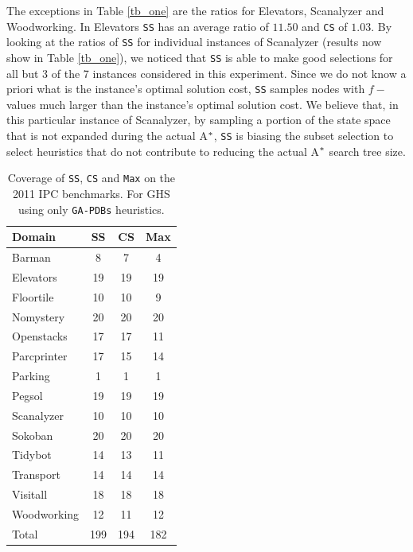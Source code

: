 The exceptions in Table \ref{tb_one} are the ratios for Elevators, Scanalyzer and Woodworking. In Elevators \texttt{SS} has an average ratio of $11.50$ and \texttt{CS} of $1.03$. By looking at the ratios of \texttt{SS} for individual instances of Scanalyzer (results now show in Table \ref{tb_one}), we noticed that \texttt{SS} is able to make good selections for all but 3 of the 7 instances considered in this experiment. Since we do not know a priori what is the instance's optimal solution cost, \texttt{SS} samples nodes with $f-$values much larger than the instance's optimal solution cost. We believe that, in this particular instance of Scanalyzer, by sampling a portion of the state space that is not expanded during the actual A$\sp{*}$, \texttt{SS} is biasing the subset selection to select heuristics that do not contribute to reducing the actual A$\sp{*}$ search tree size.

\begin{table}[]
\centering
\caption{Coverage of \texttt{SS}, \texttt{CS} and \texttt{Max} on the 2011 IPC benchmarks. For GHS using only \texttt{GA-PDBs} heuristics.}
\label{my-label}
\begin{tabular}{lccc}
\hline
Domain      & SS & CS & Max \\ \hline
Barman      & 8          & 7          & 4           \\
Elevators   & 19         & 19         & 19          \\
Floortile   & 10         & 10         & 9           \\
Nomystery   & 20         & 20         & 20          \\
Openstacks  & 17         & 17         & 11          \\
Parcprinter & 17         & 15         & 14          \\
Parking     & 1          & 1          & 1           \\
Pegsol      & 19         & 19         & 19          \\
Scanalyzer  & 10         & 10         & 10          \\
Sokoban     & 20         & 20         & 20          \\
Tidybot     & 14         & 13         & 11          \\
Transport   & 14         & 14         & 14          \\
Visitall    & 18         & 18         & 18          \\
Woodworking & 12         & 11         & 12          \\ \hline
Total       & 199        & 194        & 182         \\ \hline
\end{tabular}
\label{tb_onlygapdbs}
\end{table}


